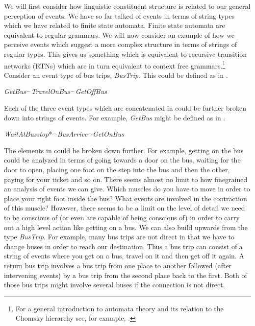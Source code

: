 We will first consider how linguistic constituent structure is related
to our general perception of events.  We have so far talked of events
in terms of string types which we have related to finite state
automata.  Finite state automata are equivalent to regular grammars.
We will now consider an example of how we perceive events which
suggest a more complex structure in terms of strings of regular
types.  This gives us something which is equivalent to recursive
transition networks (RTNs) which are in turn equivalent to context
free grammars.\footnote{For a general introduction to automata theory
  and its relation to the Chomsky hierarchy see, for example,
  \cite{ParteeMeulenWall1990}.}  Consider an event type of bus trips,
\textit{BusTrip}.  This could be defined as in \nexteg{}.
\begin{ex} 
\textit{GetBus}$^{\frown}$\textit{TravelOnBus}$^{\frown}$\textit{GetOffBus} 
\label{ex:bustrip}
\end{ex} 
Each of the three event types which are concatenated in \preveg{}
could be further broken down into strings of events.  For example,
\textit{GetBus} might be defined as in \nexteg{}.
\begin{ex} 
 \textit{WaitAtBusstop}*$^{\frown}$\textit{BusArrive}$^{\frown}$\textit{GetOnBus} 
\end{ex} 
The elements in \preveg{} could be broken down further.  For example,
getting on the bus could be analyzed in terms of going towards a door
on the bus, waiting for the door to open, placing one foot on the step
into the bus and then the other, paying for your ticket and so on.
There seems almost no limit to how finegrained an analysis of events
we can give.  Which muscles do you have to move in order to place your
right foot inside the bus?  What events are involved in the contraction
of this muscle?  However, there seems to be a limit on the level of
detail we need to be conscious of (or even are capable of being
conscious of) in order to carry out a high level action like getting
on a bus.  We can also build upwards from the type \textit{BusTrip}.
For example, many bus trips are not direct in that we have to change
buses in order to reach our destination.  Thus a bus trip can consist
of a string of events where you get on a bus, travel on it and then
get off it again.  A return bus trip involves a bus trip from one
place to another followed (after intervening events) by a bus trip
from the second place back to the first.  Both of those bus trips
might involve several buses if the connection is not direct.   

